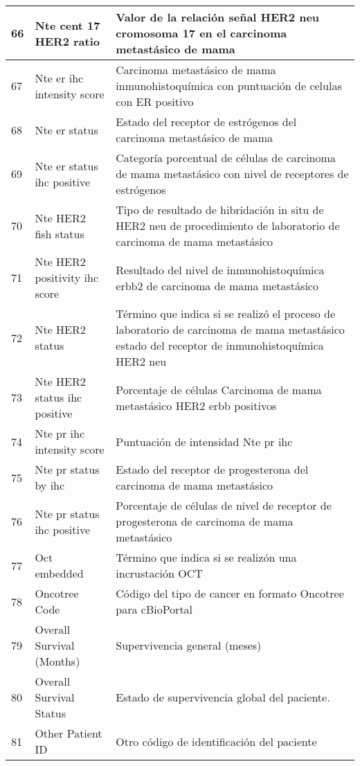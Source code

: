 \begin{table*} [!htb]
\begin{threeparttable}
\begin{tabular}{p{1cm} p{4cm} p{10cm}}
			\\ \hline	66	&	Nte cent 17 HER2 ratio	&	Valor de la relación señal HER2 neu cromosoma 17 en el carcinoma metastásico de mama 
			\\ \hline	67	&	Nte er ihc intensity score	&	Carcinoma metastásico de mama inmunohistoquímica con puntuación de celulas con ER positivo
			\\ \hline	68	&	Nte er status	&	Estado del receptor de estrógenos del carcinoma metastásico de mama
			\\ \hline	69	&	Nte er status ihc positive	&	Categoría porcentual de células de carcinoma de mama metastásico con nivel de receptores de estrógenos
			\\ \hline	70	&	Nte HER2 fish status	&	Tipo de resultado de hibridación in situ de HER2 neu de procedimiento de laboratorio de carcinoma de mama metastásico
			\\ \hline	71	&	Nte HER2 positivity ihc score	&	Resultado del nivel de inmunohistoquímica erbb2 de carcinoma de mama metastásico
			\\ \hline	72	&	Nte HER2 status	&	Término que indica si se realizó el proceso de laboratorio de carcinoma de mama metastásico estado del receptor de inmunohistoquímica HER2 neu
			\\ \hline	73	&	Nte HER2 status ihc positive	&	Porcentaje de células Carcinoma de mama metastásico HER2 erbb positivos 
			\\ \hline	74	&	Nte pr ihc intensity score	&	Puntuación de intensidad Nte pr ihc
			\\ \hline	75	&	Nte pr status by ihc	&	Estado del receptor de progesterona del carcinoma de mama metastásico
			\\ \hline	76	&	Nte pr status ihc positive	&	Porcentaje de células de nivel de receptor de progesterona de carcinoma de mama metastásico
			\\ \hline	77	&	Oct embedded	&	Término que indica si se realizón una incrustación OCT
			\\ \hline	78	&	Oncotree Code	&	Código del tipo de cancer en formato Oncotree para cBioPortal
			\\ \hline	79	&	Overall Survival (Months)	&	Supervivencia general (meses)
			\\ \hline	80	&	Overall Survival Status	&	Estado de supervivencia global del paciente.
			\\ \hline	81	&	Other Patient ID	&	Otro código de identificación del paciente
			\\ \hline
		\end{tabular}
	\end{threeparttable}
\end{table*}

